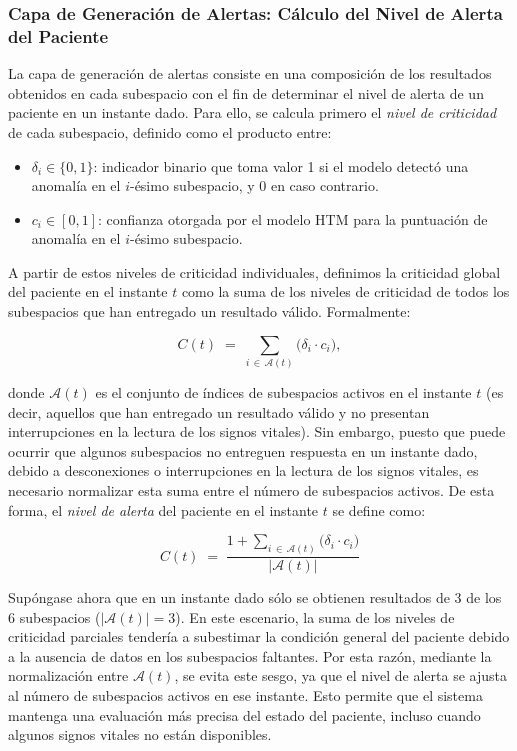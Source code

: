 \subsubsection*{Capa de Generación de Alertas: Cálculo del Nivel de Alerta del Paciente}

La capa de generación de alertas consiste en una composición de los resultados obtenidos en cada subespacio con el fin de determinar el nivel de alerta de un paciente en un instante dado. Para ello, se calcula primero el \emph{nivel de criticidad} de cada subespacio, definido como el producto entre:

\begin{itemize}
  \item $\delta_i \in \{0,1\}$: indicador binario que toma valor 1 si el modelo detectó una anomalía en el $i$-ésimo subespacio, y 0 en caso contrario.
  \item $c_i \in [0,1]$: confianza otorgada por el modelo HTM para la puntuación de anomalía en el $i$-ésimo subespacio.
\end{itemize}

A partir de estos niveles de criticidad individuales, definimos la criticidad global del paciente en el instante $t$ como la suma de los niveles de criticidad de todos los subespacios que han entregado un resultado válido. Formalmente:

\[
  C(t) \;=\; \sum_{i \,\in\, \mathcal{A}(t)} \bigl(\delta_i \cdot c_i \bigr),
\]

donde $\mathcal{A}(t)$ es el conjunto de índices de subespacios activos en el instante $t$ (es decir, aquellos que han entregado un resultado válido y no presentan interrupciones en la lectura de los signos vitales). Sin embargo, puesto que puede ocurrir que algunos subespacios no entreguen respuesta en un instante dado, debido a desconexiones o interrupciones en la lectura de los signos vitales, es necesario normalizar esta suma entre el número de subespacios activos. De esta forma, el \emph{nivel de alerta} del paciente en el instante $t$ se define como:

\[
  C(t)
  \;=\;
  \frac{
    1 + \displaystyle\sum_{i \,\in\, \mathcal{A}(t)} \bigl(\delta_i \cdot c_i \bigr)
  }{
    \bigl|\mathcal{A}(t)\bigr|
  }
\]

Supóngase ahora que en un instante dado sólo se obtienen resultados de 3 de los 6 subespacios ($|\mathcal{A}(t)| = 3$). En este escenario, la suma de los niveles de criticidad parciales tendería a subestimar la condición general del paciente debido a la ausencia de datos en los subespacios faltantes. Por esta razón, mediante la normalización entre $\mathcal{A}(t)$, se evita este sesgo, ya que el nivel de alerta se ajusta al número de subespacios activos en ese instante. Esto permite que el sistema mantenga una evaluación más precisa del estado del paciente, incluso cuando algunos signos vitales no están disponibles.

